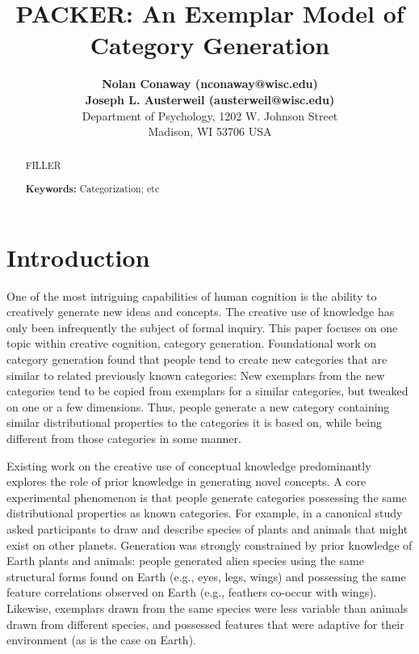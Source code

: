 \documentclass[10pt,letterpaper]{article}
\title{PACKER: An Exemplar Model of Category Generation}
\author{
{ \large \bf Nolan Conaway (nconaway@wisc.edu) } \\
{ \large \bf Joseph L. Austerweil (austerweil@wisc.edu) } \\
Department of Psychology, 1202 W. Johnson Street \\
Madison, WI 53706 USA
}
\begin{document}
\maketitle

\begin{abstract}
FILLER

\textbf{Keywords:} 
Categorization; etc
\end{abstract}

\section{Introduction}

One of the most intriguing capabilities of human cognition is the ability to creatively generate new ideas and concepts. The creative use of knowledge has only been infrequently the subject of formal inquiry. This paper focuses on one topic within creative cognition, category generation. Foundational work on category generation \citep[e.g.,][]{smith1993constraining,ward2002role,ward1994structured,ward1995s} found that people tend to create new categories that are similar to related previously known categories: New exemplars from the new categories tend to be copied from exemplars for a similar categories, but tweaked on one or a few dimensions. Thus, people generate a new category containing similar distributional properties to the categories it is based on, while being different from those categories in some manner. 

Existing work on the creative use of conceptual knowledge predominantly explores the role of prior knowledge in generating novel concepts. A core experimental phenomenon is that people generate categories possessing the same distributional properties as known categories. For example, in a canonical study \citet{ward1994structured} asked participants to draw and describe species of plants and animals that might exist on other planets. Generation was strongly constrained by prior knowledge of Earth plants and animals: people generated alien species using the same structural forms found on Earth (e.g., eyes, legs, wings) and possessing the same feature correlations observed on Earth (e.g., feathers co-occur with wings). Likewise, exemplars drawn from the same species were less variable than animals drawn from different species, and possessed features that were adaptive for their environment (as is the case on Earth).
\end{document}

